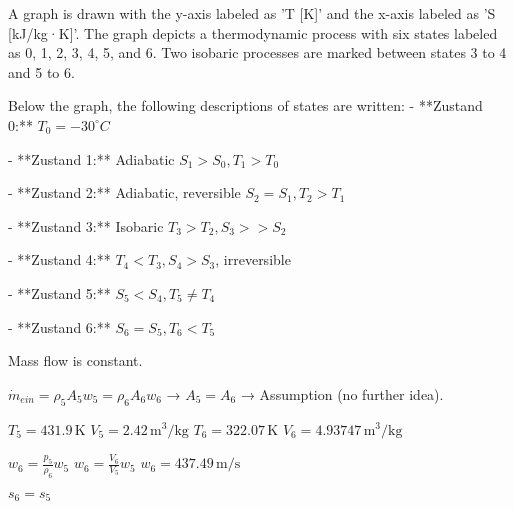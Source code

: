 A graph is drawn with the y-axis labeled as 'T [K]' and the x-axis labeled as 'S [kJ/kg·K]'. The graph depicts a thermodynamic process with six states labeled as 0, 1, 2, 3, 4, 5, and 6. Two isobaric processes are marked between states 3 to 4 and 5 to 6.  

Below the graph, the following descriptions of states are written:  
- **Zustand 0:**  
  \( T_0 = -30^\circ C \)  

- **Zustand 1:**  
  Adiabatic  
  \( S_1 > S_0, T_1 > T_0 \)  

- **Zustand 2:**  
  Adiabatic, reversible  
  \( S_2 = S_1, T_2 > T_1 \)  

- **Zustand 3:**  
  Isobaric  
  \( T_3 > T_2, S_3 >> S_2 \)  

- **Zustand 4:**  
  \( T_4 < T_3, S_4 > S_3 \), irreversible  

- **Zustand 5:**  
  \( S_5 < S_4, T_5 \neq T_4 \)  

- **Zustand 6:**  
  \( S_6 = S_5, T_6 < T_5 \)

Mass flow is constant.  

\( \dot{m}_{ein} = \rho_5 A_5 w_5 = \rho_6 A_6 w_6 \) → \( A_5 = A_6 \) → Assumption (no further idea).  

\( T_5 = 431.9 \, \text{K} \)  
\( V_5 = 2.42 \, \text{m}^3/\text{kg} \)  
\( T_6 = 322.07 \, \text{K} \)  
\( V_6 = 4.93747 \, \text{m}^3/\text{kg} \)  

\( w_6 = \frac{p_5}{\rho_6} w_5 \)  
\( w_6 = \frac{V_6}{V_5} w_5 \)  
\( w_6 = 437.49 \, \text{m/s} \)  

\( s_6 = s_5 \)